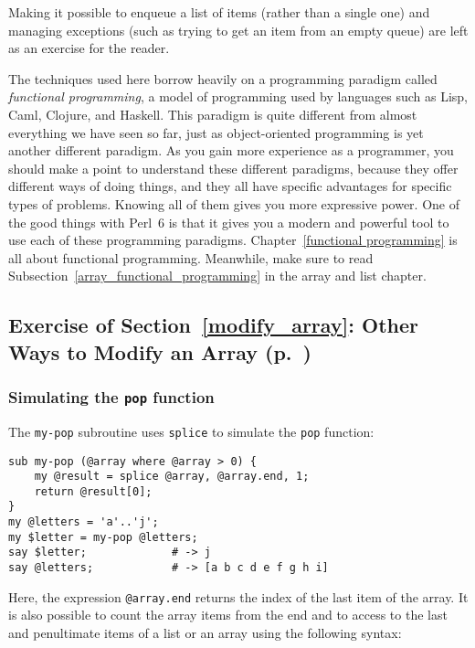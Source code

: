 Making it possible to enqueue a list of items (rather 
than a single one) and managing exceptions (such as 
trying to get an item from an empty queue) are left 
as an exercise for the reader.

The techniques used here borrow heavily on a programming 
paradigm called \emph{functional programming}, a model of 
programming used by languages such as Lisp, Caml, Clojure, and 
Haskell. This paradigm is quite different from almost 
everything we have seen so far, just as object-oriented 
programming is yet another different paradigm. As you gain 
more experience as a programmer, you should make a point 
to understand these different paradigms, because they offer 
different ways of doing things, and they all have specific 
advantages for specific types of problems. Knowing all of them 
gives you more expressive power. One of the good things with 
Perl~6 is that it gives you a modern and powerful tool to use 
each of these programming paradigms. 
Chapter~\ref{functional programming} is all about functional 
programming. Meanwhile, make sure to read 
Subsection~\ref{array_functional_programming} in the 
array and list chapter.

\subsection{Exercise of Section~\ref{modify_array}: Other Ways to Modify an Array (p.~\pageref{splice_exercise})}
\label{sol_splice_exercise}

\subsubsection{Simulating the {\tt pop} function}

The {\tt my-pop} subroutine uses {\tt splice} to simulate 
the {\tt pop} function: 

\begin{verbatim}
sub my-pop (@array where @array > 0) {
    my @result = splice @array, @array.end, 1;
    return @result[0];
}
my @letters = 'a'..'j';
my $letter = my-pop @letters;
say $letter;             # -> j
say @letters;            # -> [a b c d e f g h i]
\end{verbatim}

Here, the expression \verb'@array.end' returns the index of 
the last item of the array. It is also possible to count 
the array items from the end and to access to the last and 
penultimate items of a list or an array using the following 
syntax:

